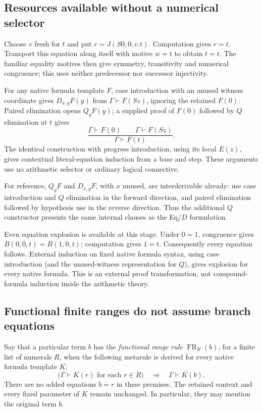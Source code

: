 \documentclass[11pt]{article}
\theoremstyle{definition}
\begin{document}
\subsection{Resources available without a numerical selector}

Choose $v$ fresh for $t$ and put $r=J(S0,0;v.t)$.  Computation gives
$r=t$.  Transport this equation along itself with motive $w=t$ to obtain
$t=t$.  The familiar equality motives then give symmetry, transitivity
and numerical congruence; this uses neither predecessor nor successor
injectivity.

For any native formula template $F$, case introduction with an unused
witness coordinate gives $D_{x,y}F(y)$ from
$\Gamma\vdash F(Sz)$, ignoring the retained $F(0)$.  Paired elimination
opens $Q_yF(y)$; a supplied proof of $F(0)$ followed by $Q$ elimination
at $t$ gives
\[
 \frac{\Gamma\vdash F(0)\qquad\Gamma\vdash F(Sz)}
      {\Gamma\vdash F(t)}. \tag{Native NC}\label{nb:nc}
\]
The identical construction with progress introduction, using its local
$E(z)$, gives contextual literal-equation induction from a base and step.
These arguments use no arithmetic selector or ordinary logical connective.

For reference, $Q_yF$ and $D_{x,y}F$, with $x$ unused, are interderivable
already: use case introduction and $Q$ elimination in the forward
direction, and paired elimination followed by hypothesis use in the
reverse direction.  Thus the additional $Q$ constructor presents the
same internal clauses as the Eq/$D$ formulation.

Even equation explosion is available at this stage.  Under $0=1$,
congruence gives $B(0,0,t)=B(1,0,t)$; computation gives $1=t$.
Consequently every equation follows.  External induction on fixed native
formula syntax, using case introduction (and the unused-witness
representation for $Q$), gives explosion for every native formula.
This is an external proof transformation, not compound-formula induction
inside the arithmetic theory.

\subsection{Functional finite ranges do not assume branch equations}

Say that a particular term $b$ has the \emph{functional range rule}
$\operatorname{FR}_R(b)$, for a finite list of numerals $R$, when the
following metarule is derived for every native formula template $K$:
\[
 \bigl(\Gamma\vdash K(r)\text{ for each }r\in R\bigr)
 \quad\Longrightarrow\quad\Gamma\vdash K(b).
 \tag{FR}\label{nb:fr}
\]
There are no added equations $b=r$ in these premises.  The retained
context and every fixed parameter of $K$ remain unchanged.  In
particular, they may mention the original term $b$.
\end{document}
